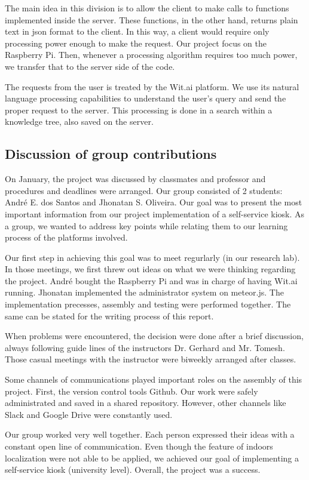 The main idea in this division is to allow the client to make calls to functions implemented inside the server.
These functions, in the other hand, returns plain text in json format to the client.
In this way, a client would require only processing power enough to make the request.
Our project focus on the Raspberry Pi.
Then, whenever a processing algorithm requires too much power, we transfer that to the server side of the code.

The requests from the user is treated by the Wit.ai platform.
We use its natural language processing capabilities to understand the user's query and send the proper request to the server.
This processing is done in a search within a knowledge tree, also saved on the server.

\subsection{Discussion of group contributions}

On January, the project was discussed by classmates and professor and procedures and deadlines were arranged.
Our group consisted of 2 students: André E. dos Santos and Jhonatan S. Oliveira. 
Our goal was to present the most important information from our project implementation of a self-service kiosk.
As a group, we wanted to address key points while relating them to our learning process of the platforms involved.

Our first step in achieving this goal was to meet regurlarly (in our research lab).
In those meetings, we first threw out ideas on what we were thinking regarding the project. 
André bought the Raspberry Pi and was in charge of having Wit.ai running.
Jhonatan implemented the administrator system on meteor.js.
The implementation precesses, assembly and testing were performed together.
The same can be stated for the writing process of this report.


When problems were encountered, the decision were done after a brief discussion, always following guide lines of the instructors Dr. Gerhard and Mr. Tomesh.
Those casual meetings with the instructor were biweekly arranged after classes.


Some channels of communications played important roles on the assembly of this project.
First, the version control tools Github.
Our work were safely administrated and saved in a shared repository.
However, other channels like Slack and  Google Drive were constantly used.


Our group worked very well together. 
Each person expressed their ideas with a constant open line of communication. 
Even though the feature of indoors localization were not able to be applied, we achieved our goal of implementing a self-service kiosk (university level).  
Overall, the project was a success. 



